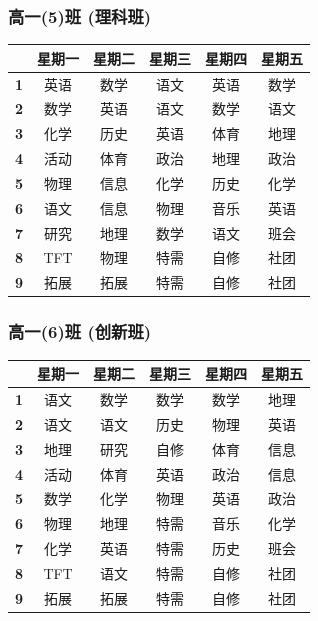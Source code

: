 \documentclass[a4paper]{article}
\begin{document}
  \subsubsection{高一(5)班 (理科班)}
   \begin{tabular}{|c|c|c|c|c|c|}
   \hline
   & \bf 星期一 & \bf 星期二 & \bf 星期三 & \bf 星期四 & \bf 星期五 \\\hline
   \bf 1 & 英语 & 数学 & 语文 & 英语 & 数学 \\\hline
   \bf 2 & 数学 & 英语 & 语文 & 数学 & 语文 \\\hline
   \bf 3 & 化学 & 历史 & 英语 & 体育 & 地理 \\\hline
   \bf 4 & 活动 & 体育 & 政治 & 地理 & 政治 \\\hline
   \bf 5 & 物理 & 信息 & 化学 & 历史 & 化学 \\\hline
   \bf 6 & 语文 & 信息 & 物理 & 音乐 & 英语 \\\hline
   \bf 7 & 研究 & 地理 & 数学 & 语文 & 班会 \\\hline
   \bf 8 & TFT  & 物理 & 特需 & 自修 & 社团 \\\hline
   \bf 9 & 拓展 & 拓展 & 特需 & 自修 & 社团 \\\hline
   \end{tabular}
  \subsubsection{高一(6)班 (创新班)}
   \begin{tabular}{|c|c|c|c|c|c|}
   \hline
   & \bf 星期一 & \bf 星期二 & \bf 星期三 & \bf 星期四 & \bf 星期五 \\\hline
   \bf 1 & 语文 & 数学 & 数学 & 数学 & 地理 \\\hline
   \bf 2 & 语文 & 语文 & 历史 & 物理 & 英语 \\\hline
   \bf 3 & 地理 & 研究 & 自修 & 体育 & 信息 \\\hline
   \bf 4 & 活动 & 体育 & 英语 & 政治 & 信息 \\\hline
   \bf 5 & 数学 & 化学 & 物理 & 英语 & 政治 \\\hline
   \bf 6 & 物理 & 地理 & 特需 & 音乐 & 化学 \\\hline
   \bf 7 & 化学 & 英语 & 特需 & 历史 & 班会 \\\hline
   \bf 8 & TFT  & 语文 & 特需 & 自修 & 社团 \\\hline
   \bf 9 & 拓展 & 拓展 & 特需 & 自修 & 社团 \\\hline
   \end{tabular}
\end{document}
